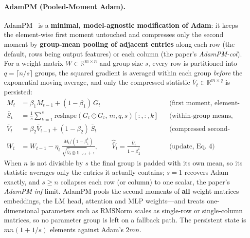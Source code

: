 \paragraph{AdamPM (Pooled-Moment Adam).}
AdamPM~\citep{ji_adampm_2026} is a \textbf{minimal, model-agnostic modification of
Adam}: it keeps the element-wise first moment untouched and compresses only the
second moment by \textbf{group-mean pooling of adjacent entries} along each row
(the default, rows being output features) or each column (the paper's
\emph{AdamPM-col}). For a weight matrix $W \in \mathbb{R}^{m \times n}$ and group
size $s$, every row is partitioned into $q = \lceil n/s \rceil$ groups, the
squared gradient is averaged within each group \emph{before} the exponential
moving average, and only the compressed statistic
$\bar{V}_t \in \mathbb{R}^{m \times q}$ is persisted:
\begin{align}
M_t &= \beta_1 M_{t-1} + (1-\beta_1)\, G_t
     && \text{(first moment, element-wise, Eq.~1)} \\
\bar{S}_t &= \frac{1}{s}\sum_{k=1}^{s}
     \mathrm{reshape}(G_t \odot G_t,\, m, q, s)[:,:,k]
     && \text{(within-group means, Eq.~2)} \\
\bar{V}_t &= \beta_2 \bar{V}_{t-1} + (1-\beta_2)\, \bar{S}_t
     && \text{(compressed second-moment EMA, Eq.~3)} \\
W_t &= W_{t-1} - \eta_t \,
     \frac{M_t/(1-\beta_1^t)}
          {\sqrt{\hat{\bar{V}}_t \otimes \mathbf{1}_{1\times s}} + \epsilon},
\qquad \hat{\bar{V}}_t = \frac{\bar{V}_t}{1-\beta_2^t}
     && \text{(update, Eq.~4)}
\end{align}
When $n$ is not divisible by $s$ the final group is padded with its own mean, so
its statistic averages only the entries it actually contains; $s{=}1$ recovers
Adam exactly, and $s \ge n$ collapses each row (or column) to one scalar, the
paper's \emph{AdamPM-inf} limit. AdamPM pools the second moments of
\textbf{all} weight matrices---embeddings, the LM head, attention and MLP
weights---and treats one-dimensional parameters such as RMSNorm scales as
single-row or single-column matrices, so no parameter group is left on a
fallback path. The persistent state is $mn(1+1/s)$ elements against Adam's
$2mn$.

